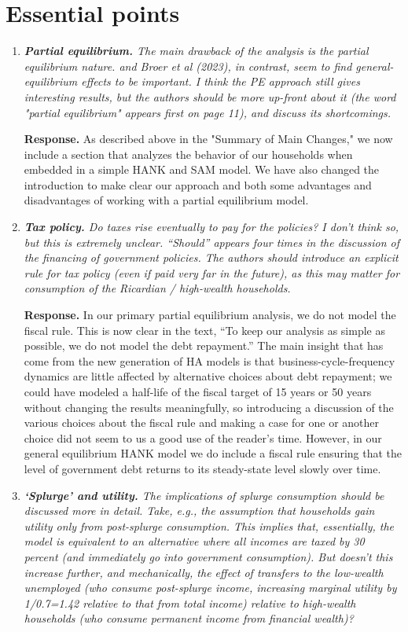 \documentclass[12pt,letterpaper,english]{article}
\begin{document}
\section{Essential points}
\begin{enumerate}
	\item \textit{\textbf{Partial equilibrium.} The main drawback of the analysis is the partial equilibrium nature. \citet{kekre2022unemp} and Broer et al (2023), in contrast, seem to find general-equilibrium effects to be important. I think the PE approach still gives interesting results, but the authors should be more up-front about it (the word "partial equilibrium" appears first on page 11), and discuss its shortcomings.}
	
	\noindent \textbf{Response.} As described above in the "Summary of Main Changes," we now include a section that analyzes the behavior of our households when embedded in a simple HANK and SAM model. We have also changed the introduction to make clear our approach and both some advantages and disadvantages of working with a partial equilibrium model.
	
	\item \textit{\textbf{Tax policy.} Do taxes rise eventually to pay for the policies? I don't think so, but this is extremely unclear. ``Should'' appears four times in the discussion of the financing of government policies. The authors should introduce an explicit rule for tax policy (even if paid very far in the future), as this may matter for consumption of the Ricardian / high-wealth households.}
	
	\noindent \textbf{Response.} In our primary partial equilibrium analysis, we do not model the fiscal rule. This is now clear in the text, ``To keep our analysis as simple as possible, we do not model the debt repayment.''  The main insight that has come from the new generation of HA models is that business-cycle-frequency dynamics are little affected by alternative choices about debt repayment; we could have modeled a half-life of the fiscal target of 15 years or 50 years without changing the results meaningfully, so introducing a discussion of the various choices about the fiscal rule and making a case for one or another choice did not seem to us a good use of the reader's time. However, in our general equilibrium HANK model we do include a fiscal rule ensuring that the level of government debt returns to its steady-state level slowly over time.
	
	\item \textit{\textbf{`Splurge' and utility.} The implications of splurge consumption should be discussed more in detail. Take, e.g., the assumption that households gain utility only from post-splurge consumption. This implies that, essentially, the model is equivalent to an alternative where all incomes are taxed by 30 percent (and immediately go into government consumption). But doesn't this increase further, and mechanically, the effect of transfers to the low-wealth unemployed (who consume post-splurge income, increasing marginal utility by 1/0.7=1.42 relative to that from total income) relative to high-wealth households (who consume permanent income from financial wealth)?}
		

\end{enumerate}
\end{document}
